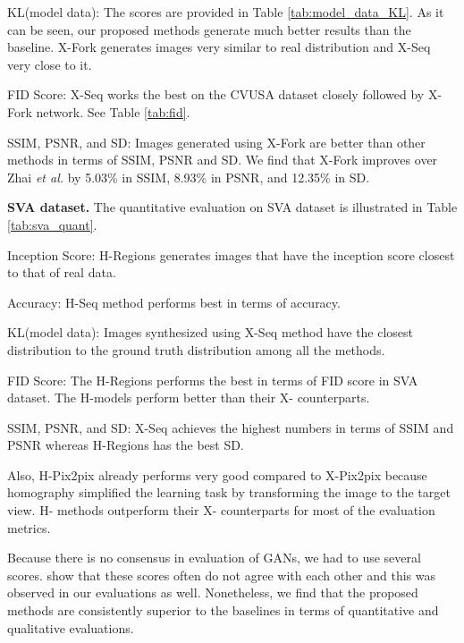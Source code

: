 \documentclass[times,twocolumn,final,authoryear]{elsarticle_modified}
\begin{document}
KL(model  data):
The scores are provided in Table \ref{tab:model_data_KL}. As it can be seen, our proposed methods generate much better results than the baseline. X-Fork generates images very similar to real distribution and X-Seq very close to it. 

{FID Score:} X-Seq works the best on the CVUSA dataset closely followed by X-Fork network. See Table \ref{tab:fid}.

{SSIM, PSNR, and SD:} Images generated using X-Fork are better than other methods in terms of SSIM, PSNR and SD. We find that X-Fork improves over Zhai \textit{et al.} by 5.03\% in SSIM, 8.93\% in PSNR, and 12.35\% in SD. 



\noindent \textbf{SVA dataset.} The quantitative evaluation on SVA dataset is illustrated in Table \ref{tab:sva_quant}.

Inception Score: H-Regions generates images that have the inception score closest to that of real data.


Accuracy: 
H-Seq method performs best in terms of accuracy.

KL(model  data):
Images synthesized using X-Seq method have the closest distribution to the ground truth distribution among all the methods.

{FID Score:} The H-Regions performs the best in terms of FID score in SVA dataset. The H-models perform better than their X- counterparts.

{SSIM, PSNR, and SD:}
X-Seq achieves the highest numbers in terms of SSIM and PSNR whereas H-Regions has the best SD.


Also, H-Pix2pix already performs very good compared to X-Pix2pix because homography simplified the learning task by transforming the image to the target view. H- methods outperform their X- counterparts for most of the evaluation metrics.

Because there is no consensus in evaluation of GANs, we had to use several scores. \cite{Theis2016a} show that these scores often do not agree with each other and this was observed in our evaluations as well. Nonetheless, we find that the proposed methods are consistently superior to the baselines in terms of quantitative and qualitative evaluations. 
\end{document}
